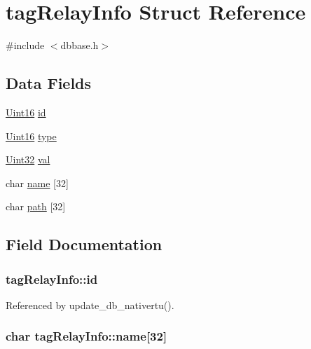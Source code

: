 \hypertarget{structtagRelayInfo}{\section{tag\-Relay\-Info Struct Reference}
\label{structtagRelayInfo}
}


{\ttfamily \#include $<$dbbase.\-h$>$}

\subsection*{Data Fields}
\begin{DoxyCompactItemize}
\item 
\hyperlink{base_8h_ae9f2e1f80fbd243687a04febbf590e13}{Uint16} \hyperlink{structtagRelayInfo_ae8e5eea2854587a39a0bdefffaa6ebee}{id}
\item 
\hyperlink{base_8h_ae9f2e1f80fbd243687a04febbf590e13}{Uint16} \hyperlink{structtagRelayInfo_ab628490738aeed7e76fbcdd59fd9573e}{type}
\item 
\hyperlink{base_8h_a60cf7b3c038ce37a50796e8eaddf0b5f}{Uint32} \hyperlink{structtagRelayInfo_a17da547b7af601809c5e93a6f76c2ff2}{val}
\item 
char \hyperlink{structtagRelayInfo_a9f83f6fac827cd0c5019a35fd5679001}{name} \mbox{[}32\mbox{]}
\item 
char \hyperlink{structtagRelayInfo_aba2860c27c092dba8facfbd11ec1064a}{path} \mbox{[}32\mbox{]}
\end{DoxyCompactItemize}


\subsection{Field Documentation}
\hypertarget{structtagRelayInfo_ae8e5eea2854587a39a0bdefffaa6ebee}{
\subsubsection[{id}]{ tag\-Relay\-Info\-::id}}\label{structtagRelayInfo_ae8e5eea2854587a39a0bdefffaa6ebee}


Referenced by update\-\_\-db\-\_\-nativertu().

\hypertarget{structtagRelayInfo_a9f83f6fac827cd0c5019a35fd5679001}{
\subsubsection[{name}]{\setlength{\rightskip}{0pt plus 5cm}char tag\-Relay\-Info\-::name\mbox{[}32\mbox{]}}}\label{structtagRelayInfo_a9f83f6fac827cd0c5019a35fd5679001}


